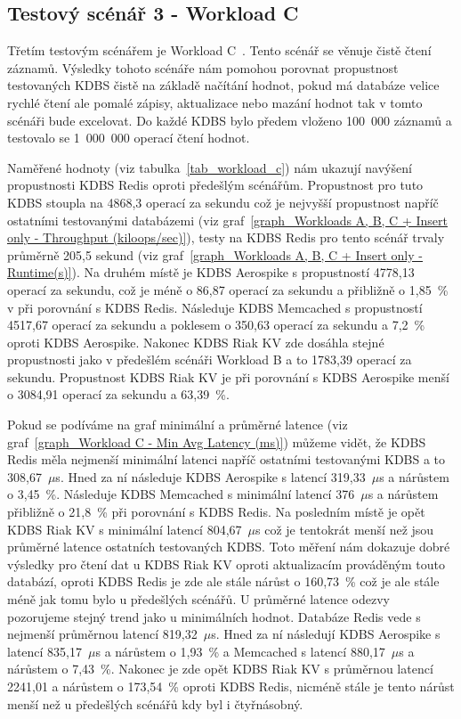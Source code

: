 \documentclass[czech,master,dept460,male,csharp,cpdeclaration]{diploma}
\begin{document}
	\subsection{Testový scénář 3 - Workload C}
	
	Třetím testovým scénářem je Workload C~\cite{workloads}. Tento scénář se věnuje čistě čtení záznamů. Výsledky tohoto scénáře nám pomohou porovnat propustnost testovaných KDBS čistě na základě načítání hodnot, pokud má databáze velice rychlé čtení ale pomalé zápisy, aktualizace nebo mazání hodnot tak v tomto scénáři bude excelovat. Do každé KDBS bylo předem vloženo 100~000 záznamů a testovalo se 1~000~000 operací čtení hodnot.
	
	Naměřené hodnoty (viz tabulka~\ref{tab_workload_c}) nám ukazují navýšení propustnosti KDBS Redis oproti předešlým scénářům. Propustnost pro tuto KDBS stoupla na 4868,3 operací za sekundu což je nejvyšší propustnost napříč ostatními testovanými databázemi (viz graf~\ref{graph_Workloads A, B, C + Insert only - Throughput (kiloops/sec)}), testy na KDBS Redis pro tento scénář trvaly průměrně 205,5 sekund (viz graf~\ref{graph_Workloads A, B, C + Insert only - Runtime(s)}). Na druhém místě je KDBS Aerospike s propustností 4778,13 operací za sekundu, což je méně o 86,87 operací za sekundu a přibližně o 1,85~\% v při porovnání s KDBS Redis. Následuje KDBS Memcached s propustností 4517,67 operací za sekundu a poklesem o 350,63 operací za sekundu a 7,2~\% oproti KDBS Aerospike. Nakonec KDBS Riak KV zde dosáhla stejné propustnosti jako v předešlém scénáři Workload B a to 1783,39 operací za sekundu. Propustnost KDBS Riak KV je při porovnání s KDBS Aerospike menší o 3084,91 operací za sekundu a 63,39~\%.
	
	Pokud se podíváme na graf minimální a průměrné latence (viz graf~\ref{graph_Workload C - Min Avg Latency (ms)}) můžeme vidět, že KDBS Redis měla nejmenší minimální latenci napříč ostatními testovanými KDBS a to 308,67~$\mu$s. Hned za ní následuje KDBS Aerospike s latencí 319,33~$\mu$s a nárůstem o 3,45~\%. Následuje KDBS Memcached s minimální latencí 376~$\mu$s a nárůstem přibližně o 21,8~\% při porovnání s KDBS Redis. Na posledním místě je opět KDBS Riak KV s minimální latencí 804,67~$\mu$s což je tentokrát menší než jsou průměrné latence ostatních testovaných KDBS. Toto měření nám dokazuje dobré výsledky pro čtení dat u KDBS Riak KV oproti aktualizacím prováděným touto databází, oproti KDBS Redis je zde ale stále nárůst o 160,73~\% což je ale stále méně jak tomu bylo u předešlých scénářů. U průměrné latence odezvy pozorujeme stejný trend jako u minimálních hodnot. Databáze Redis vede s nejmenší průměrnou latencí 819,32~$\mu$s. Hned za ní následují KDBS Aerospike s latencí 835,17~$\mu$s a nárůstem o 1,93~\% a Memcached s latencí 880,17~$\mu$s a nárůstem o 7,43~\%. Nakonec je zde opět KDBS Riak KV s průměrnou latencí 2241,01 a nárůstem o 173,54~\% oproti KDBS Redis, nicméně stále je tento nárůst menší než u předešlých scénářů kdy byl i čtyřnásobný.
	
\end{document}
